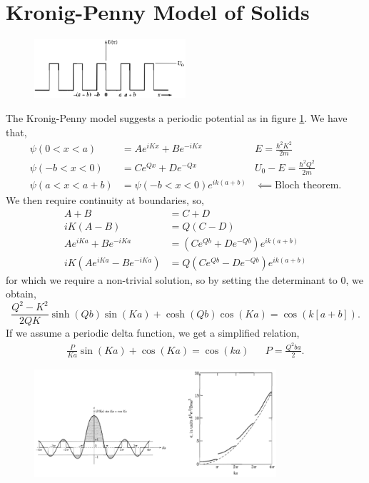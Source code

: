 \documentclass{book}
\begin{document}
\section{Kronig-Penny Model of Solids}
\begin{figure}[h]
	\centering
	\includegraphics[width=0.5\textwidth]{krony.png}
	\caption{}
	\label{fig:krony}
\end{figure}
The Kronig-Penny model suggests a periodic potential as in figure \ref{fig:krony}. We have that,
\begin{align}
	\psi(0 < x < a) &= Ae^{iKx}+Be^{-iKx} & E = \frac{\hbar^2K^2}{2m} \\
	\psi(-b < x < 0) &= Ce^{Qx} + De^{-Qx} & U_0 - E = \frac{\hbar^2Q^2}{2m} \\
	\psi(a < x < a + b) & = \psi(-b < x < 0)e^{ik(a+b)} & \impliedby \text{Bloch theorem}.
\end{align}
We then require continuity at boundaries, so,
\begin{align}
	A + B &= C + D \\
	iK(A-B) &= Q(C-D) \\
	Ae^{iKa} + Be^{-iKa} &= (Ce^{Qb} + De^{-Qb})e^{ik(a+b)} \\
	iK(Ae^{iKa} - Be^{-iKa}) &= Q(Ce^{Qb} - De^{-Qb})e^{ik(a+b)}
\end{align}
for which we require a non-trivial solution, so by setting the determinant to 0, we obtain,
\begin{equation}
	\boxed{\frac{Q^2 - K^2}{2QK}\sinh(Qb)\sin(Ka) + \cosh(Qb)\cos(Ka) = \cos(k\left[a+b\right])}.
\end{equation}
If we assume a periodic delta function, we get a simplified relation,
\begin{align}
	\frac{P}{Ka}\sin(Ka) + \cos(Ka) = \cos(ka) &&
	P = \frac{Q^2ba}{2}.
\end{align}
\begin{figure}[b]
	\centering
	\includegraphics[width=0.8\textwidth]{K.png}
	\caption{}
	\label{eq:K}
\end{figure}\noindent
\end{document}
